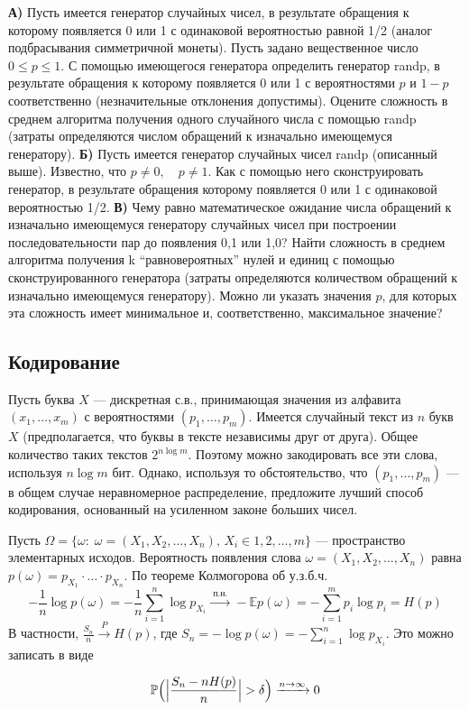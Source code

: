 \begin{problem}
\textbf{А)} Пусть имеется генератор случайных чисел, в 
результате обращения к которому появляется 0 или 1 с одинаковой вероятностью 
равной 1/2 (аналог подбрасывания симметричной монеты). Пусть задано 
вещественное число $0\le p\le 1$. С помощью имеющегося генератора определить 
генератор randp, в результате обращения к которому появляется 0 или 1 с 
вероятностями $p$ и $1-p$ соответственно (незначительные отклонения 
допустимы). Оцените сложность в среднем алгоритма получения одного 
случайного числа с помощью randp (затраты определяются числом обращений к 
изначально имеющемуся генератору). \textbf{Б)} Пусть имеется генератор 
случайных чисел randp (описанный выше). Известно, что $p\ne 0,\quad p\ne 1$. 
Как с помощью него сконструировать генератор, в результате обращения 
которому появляется 0 или 1 с одинаковой вероятностью 1/2. \textbf{В)} Чему 
равно математическое ожидание числа обращений к изначально имеющемуся 
генератору случайных чисел при построении последовательности пар до 
появления 0,1 или 1,0? Найти сложность в среднем алгоритма получения k 
``равновероятных'' нулей и единиц с помощью сконструированного генератора 
(затраты определяются количеством обращений к изначально имеющемуся 
генератору). Можно ли указать значения $p$, для которых эта сложность имеет 
минимальное и, соответственно, максимальное значение?
\end{problem}




\subsection{Кодирование}

\begin{problem}
Пусть буква $X$ --- дискретная с.в., принимающая значения из алфавита $(x_1,\ldots,x_m)$ с вероятностями $(p_1,\ldots,p_m)$. 
Имеется случайный текст из $n$ букв $X$ (предполагается, что буквы в тексте независимы друг от друга). Общее количество таких 
текстов $2^{n\log m}$. Поэтому можно закодировать все эти слова, используя $n\log m$ бит. Однако, используя то обстоятельство, что 
$(p_1,\ldots,p_m)$ --- в общем случае неравномерное распределение, предложите лучший способ кодирования, основанный 
на усиленном законе больших чисел.
\end{problem}

\begin{ordre}
Пусть $\Omega=\{ \omega:\; \omega=(X_1,X_2,\ldots, X_n),\, X_i\in 1,2,\ldots,m\}$ --- пространство элементарных исходов. 
Вероятность появления слова $\omega=(X_1,X_2,\ldots, X_n)$ равна $p(\omega)=p_{X_1}\cdot\ldots\cdot p_{X_n}$. По теореме Колмогорова об 
у.з.б.ч. 
$$
-\frac{1}{n}\log p(\omega)=-\frac{1}{n}\sum\limits_{i=1}^{n}\log p_{X_i} \xrightarrow{\text{ п.н. }} 
-{\mathbb E}p(\omega)=-\sum\limits_{i=1}^{m}p_i\log p_i=H(p) 
$$
В частности, $\frac{S_n}{n}\xrightarrow{P}H(p)$, где $S_n=-\log p(\omega)=-\sum\limits_{i=1}^{n}\log p_{X_i}$. Это можно записать в виде 

$$
{\mathbb P}\Bigl( \Bigl| \frac{S_n-nH(p)}{n}\Bigr|>\delta \Bigr)  \xrightarrow{n\to\infty} 0 
$$
\end{ordre}


